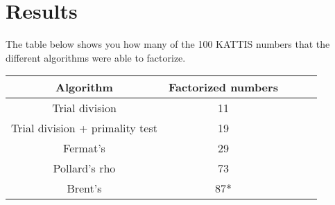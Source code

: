 \documentclass[paper=a4, fontsize=11pt,numbers=endperiod]{scrartcl} %
\numberwithin{equation}{section} %
\numberwithin{figure}{section} %
\numberwithin{table}{section} %
\begin{document}


\section{Results}

The table below shows you how many of the 100 KATTIS numbers that the different algorithms were able to factorize.

    \begin{tabular}{|c|c|c|c|c|}
    \hline
    \textbf{Algorithm} & \textbf{Factorized numbers} \\ \hline
    Trial division & 11 \\ \hline
    Trial division + primality test & 19 \\ \hline
    Fermat's & 29 \\ \hline
    Pollard's rho & 73 \\ \hline
    Brent's & 87* \\ \hline
    \end{tabular}
    \hspace{10pt}
\end{document}
